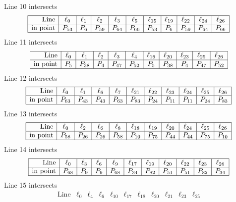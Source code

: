 \documentclass{article}
\begin{document}
{$$$$
Line 10 intersects 
$$
\begin{array}{|r*{10}{|c}|}
\hline
\mbox{Line}  & \ell_{0} & \ell_{1} & \ell_{2} & \ell_{3} & \ell_{5} & \ell_{15} & \ell_{19} & \ell_{22} & \ell_{24} & \ell_{26}\\
\hline
\mbox{in point}  & P_{53} & P_{6} & P_{59} & P_{64} & P_{66} & P_{53} & P_{6} & P_{59} & P_{64} & P_{66}\\
\hline
\end{array}
$$
Line 11 intersects 
$$
\begin{array}{|r*{10}{|c}|}
\hline
\mbox{Line}  & \ell_{0} & \ell_{1} & \ell_{2} & \ell_{3} & \ell_{4} & \ell_{16} & \ell_{20} & \ell_{23} & \ell_{25} & \ell_{26}\\
\hline
\mbox{in point}  & P_{5} & P_{38} & P_{4} & P_{47} & P_{52} & P_{5} & P_{38} & P_{4} & P_{47} & P_{52}\\
\hline
\end{array}
$$
Line 12 intersects 
$$
\begin{array}{|r*{10}{|c}|}
\hline
\mbox{Line}  & \ell_{0} & \ell_{1} & \ell_{6} & \ell_{7} & \ell_{21} & \ell_{22} & \ell_{23} & \ell_{24} & \ell_{25} & \ell_{26}\\
\hline
\mbox{in point}  & P_{63} & P_{43} & P_{43} & P_{63} & P_{83} & P_{24} & P_{11} & P_{11} & P_{24} & P_{83}\\
\hline
\end{array}
$$
Line 13 intersects 
$$
\begin{array}{|r*{10}{|c}|}
\hline
\mbox{Line}  & \ell_{0} & \ell_{2} & \ell_{6} & \ell_{8} & \ell_{18} & \ell_{19} & \ell_{20} & \ell_{24} & \ell_{25} & \ell_{26}\\
\hline
\mbox{in point}  & P_{58} & P_{26} & P_{26} & P_{58} & P_{10} & P_{75} & P_{44} & P_{44} & P_{75} & P_{10}\\
\hline
\end{array}
$$
Line 14 intersects 
$$
\begin{array}{|r*{10}{|c}|}
\hline
\mbox{Line}  & \ell_{0} & \ell_{3} & \ell_{6} & \ell_{9} & \ell_{17} & \ell_{19} & \ell_{20} & \ell_{22} & \ell_{23} & \ell_{26}\\
\hline
\mbox{in point}  & P_{68} & P_{9} & P_{9} & P_{68} & P_{34} & P_{82} & P_{51} & P_{51} & P_{82} & P_{34}\\
\hline
\end{array}
$$
Line 15 intersects 
$$
\begin{array}{|r*{10}{|c}|}
\hline
\mbox{Line}  & \ell_{0} & \ell_{4} & \ell_{6} & \ell_{10} & \ell_{17} & \ell_{18} & \ell_{20} & \ell_{21} & \ell_{23} & \ell_{25}\\

\end{array}$$}
\end{document}
